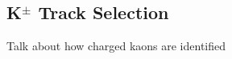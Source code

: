 \subsection{\texorpdfstring{K$^{\pm}$}{TEXT} Track Selection}
\label{KchTrackSelection}

Talk about how charged kaons are identified